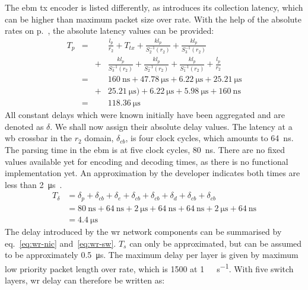 The \gls{ebm} \gls{tx} encoder is listed differently, as introduces its collection latency, which can be higher than maximum packet size over rate. 
With the help of the absolute rates on p.~\pageref{eq:rates}, the absolute latency values can be provided:
%
\begin{equation}
\begin{aligned}
T_p &=&&  \frac{l_p}{r_2} + T_{tx} +  \frac{kl_p}{S^{-1}_2(r_2)} +  \frac{kl_p}{S^{-1}_3(r_2)}\\[8pt] 
       &&+&   \frac{kl_p}{S^{-1}_3(r_2)} +  \frac{kl_p}{S^{-1}_2(r_2)} + \frac{kl_p}{S^{-1}_1(r_2)} +\frac{l_p}{r_2} \\[8pt]
&=&& \SI{160}{\nano\second} + \SI{47.78}{\micro\second}  +  \SI{6.22}{\micro\second} +  \SI{25.21}{\micro\second} \\[8pt] 
&&+&  \SI{25.21}{\micro\second}) + \SI{6.22}{\micro\second} + \SI{5.98}{\micro\second} + \SI{160}{\nano\second} \\[8pt]
&=&&  \SI{118.36}{\micro\second}
\end{aligned}
\end{equation}
%
All constant delays which were known initially have been aggregated and are denoted as $\delta$. We shall now assign their absolute delay values. The latency at a \gls{wb} crossbar in the $r_2$ domain, $\delta_{cb}$,
is four clock cycles, which amounts to \SI{64}{\nano\second}. The parsing time in the \gls{ebm} is at five clock cycles, \SI{80}{\nano\second}. There are no fixed values available yet for 
encoding and decoding times, as there is no functional implementation yet. An approximation by the developer indicates both times are less than \SI{2}{\micro\second}~\cite{lipinski_white_2011-1}.
%
\begin{equation}
\begin{aligned}
T_\delta &= \delta_{p} + \delta_{cb} + \delta_{e} + \delta_{cb} + \delta_{cb} +\delta_{d} + \delta_{cb} + \delta_{cb}\\
&= \SI{80}{\nano\second} + \SI{64}{\nano\second} + \SI{2}{\micro\second} + \SI{64}{\nano\second} + \SI{64}{\nano\second} + \SI{2}{\micro\second} + \SI{64}{\nano\second}\\
&= \SI{4.4}{\micro\second}
 \end{aligned}
\end{equation}
%
The delay introduced by the \gls{wr} network components can be summarised by eq.~\ref{eq:wr-nic} and~\ref{eq:wr-sw}. $T_s$ can only be approximated, but can be assumed to be approximately \SI{0.5}{\micro\second}.
The maximum delay per layer is given by maximum low priority packet length over rate, which is \SI{1500}{\byte} at \SI{1}{\giga\bit\per\second}. With five switch layers, \gls{wr} delay can therefore be written as:
